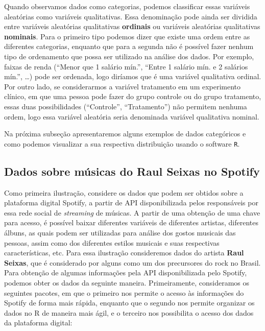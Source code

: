 \documentclass[]{book}
\begin{document}
Quando observamos dados como categorias, podemos classificar essas variáveis aleatórias como variáveis qualitativas. Essa denominação pode ainda ser dividida entre variáveis aleatórias qualitativas \textbf{ordinais} ou variáveis aleatórias qualitativas \textbf{nominais}. Para o primeiro tipo podemos dizer que existe uma ordem entre as diferentes categorias, enquanto que para a segunda não é possível fazer nenhum tipo de ordenamento que possa ser utilizado na análise dos dados. Por exemplo, faixas de renda (``Menor que 1 salário mín.'', ``Entre 1 salário mín. e 2 salários mín.'', \ldots{}) pode ser ordenada, logo diríamos que é uma variável qualitativa ordinal. Por outro lado, se considerarmos a variável tratamento em um experimento clínico, em que uma pessoa pode fazer do grupo controle ou do grupo tratamento, essas duas possibilidades (``Controle'', ``Tratamento'') não permitem nenhuma ordem, logo essa variável aleatória seria denominada variável qualitativa nominal.

Na próxima subseção apresentaremos alguns exemplos de dados categóricos e como podemos visualizar a sua respectiva distribuição usando o software \texttt{R}.

\hypertarget{dados-sobre-musicas-do-raul-seixas-no-spotify}{%
\subsection{Dados sobre músicas do Raul Seixas no Spotify}\label{dados-sobre-musicas-do-raul-seixas-no-spotify}}

Como primeira ilustração, considere os dados que podem ser obtidos sobre a plataforma digital Spotify, a partir de API disponibilizada pelos responsáveis por essa rede social de \emph{streaming} de músicas. A partir de uma obtenção de uma chave para acesso, é possível baixar diferentes variáveis de diferentes artistas, diferentes álbuns, as quais podem ser utilizadas para análise dos gostos musicais das pessoas, assim como dos diferentes estilos musicais e suas respectivas características, etc. Para essa ilustração consideremos dados do artista \textbf{Raul Seixas}, que é considerado por alguns como um dos precursores do rock no Brasil. Para obtenção de algumas informações pela API disponibilizada pelo Spotify, podemos obter os dados da seguinte maneira. Primeiramente, consideramos os seguintes pacotes, em que o primeiro nos permite o acesso às informações do Spotify de forma mais rápida, enquanto que o segundo nos permite organizar os dados no R de maneira mais ágil, e o terceiro nos possibilita o acesso dos dados da plataforma digital:
\end{document}
